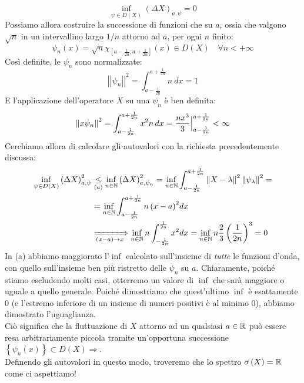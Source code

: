\documentclass[../../FisicaTeorica.tex]{subfiles}
\begin{document}
\[
\inf_{\psi\in D\left(X\right)}{\left(\Delta X\right)_{a,\psi}}=0
\]
Possiamo allora costruire la successione di funzioni che  su $a$, ossia che valgono $\sqrt{n}$ in un intervallino largo $1/n$ attorno ad $a$, per ogni $n$ finito:
\[
\psi_n\left(x\right)=\sqrt n \chi_{\left[a-\frac{1}{2n};a+\frac{1}{2n}\right]}\left(x\right)\in D\left(X\right) \quad \forall n < +\infty
\]
Così definite, le $\psi_n$ sono normalizzate:
\[
\left|\left|\psi_n\right|\right|^2= \int_{a-\frac{1}{2n}}^{a+\frac{1}{2n}}{n\ dx}=1
\]
E l'applicazione dell'operatore $X$ su una $\psi_n$ è ben definita:
\[
\left\lVert x\psi_n\right\rVert^2 = \int_{a-\frac{1}{2n}}^{a+\frac{1}{2n}} x^2 n\,dx = \frac{nx^3}{3}\Big |^{a+\frac{1}{2n}}_{a-\frac{1}{2n}} < \infty
\]
Cerchiamo allora di calcolare gli autovalori con la richiesta  precedentemente discussa:
\begin{align*}
\inf_{\psi\in D\left(X\right)}{\left(\Delta X\right)_{a,\psi}^2}&\underset{(a)}{\leq} \inf_{n\in \mathbb{N}}{\left(\Delta X\right)_{a,\psi_n}^2}=
\inf_{n\in\mathbb{N}}\int_{a-\frac{1}{2n}}^{a+\frac{1}{2n}} \left\lVert X-\lambda\right\rVert^2 \left\lVert\psi_\lambda\right\rVert^2 = \\
&= \inf_{n\in\mathbb{N}}{\int_{a-\frac{1}{2n}}^{a+\frac{1}{2n}}{{n\left(x-a\right)}^2dx}} \\
&\xRightarrow[(x-a)\to x]{} \inf_{n\in\mathbb{N}}{n\int_{-\frac{1}{2n}}^{\frac{1}{2n}}{x^2dx}=\inf_{n\in\mathbb{N}}{n\frac{2}{3}\left(\frac{1}{2n}\right)^3}}=0
\end{align*}
In (a) abbiamo maggiorato l'$\inf$ calcolato sull'insieme di \textit{tutte} le funzioni d'onda, con quello sull'insieme ben più ristretto delle $\psi_n$  su $a$. Chiaramente, poiché stiamo escludendo molti casi, otterremo un valore di $\inf$ che sarà maggiore o uguale a quello generale. Poiché dimostriamo che quest'ultimo $\inf$ è esattamente $0$ (e l'estremo inferiore di un insieme di numeri positivi è al minimo $0$), abbiamo dimostrato l'uguaglianza.\\
Ciò significa che la fluttuazione di $X$ attorno ad un qualsiasi $a\in \mathbb{R}$ può essere resa arbitrariamente piccola tramite un'opportuna successione $\left\{\psi_n(x)\right\}\subset D\left(X\right)\Rightarrow$.\\
Definendo gli autovalori in questo modo, troveremo che lo spettro $\sigma \left(X\right)=\mathbb{R}$ come ci aspettiamo!\\
\end{document}
